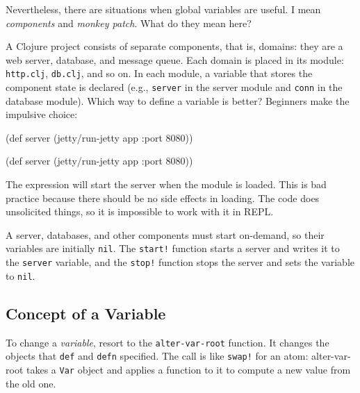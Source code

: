 Nevertheless, there are situations when global variables are useful.
I mean \emph{components} and \emph{monkey patch}. What do they mean here?

A Clojure project consists of separate components, that is, domains: they are a web server, database, and message queue.
Each domain is placed in its module: \verb|http.clj|, \verb|db.clj|, and so on. In each module, a variable that stores the component state is declared (e.g., \verb|server| in the server module and \verb|conn| in the database module).
Which way to define a variable is better?
Beginners make the impulsive choice:

\ifx\DEVICETYPE\MOBILE

\begin{english}
  \begin{clojure}
(def server
  (jetty/run-jetty app {:port 8080}))
  \end{clojure}
\end{english}

\else

\begin{english}
  \begin{clojure}
(def server (jetty/run-jetty app {:port 8080}))
  \end{clojure}
\end{english}

\fi

The expression will start the server when the module is loaded. This is bad practice because there should be no side effects in loading.
The code does unsolicited things, so it is impossible to work with it in REPL.

A server, databases, and other components must start on-demand, so their variables are initially \verb|nil|.
The \verb|start!| function starts a server and writes it to the \verb|server| variable, and the \verb|stop!| function stops the server and sets the variable to \verb|nil|.

\subsection{Concept of a Variable}


\label{var-section}

To change a \emph{variable}, resort to the \verb|alter-var-root| function.
It changes the objects that \verb|def| and \verb|defn| specified.
The call is like \verb|swap!| for an atom: alter-var-root takes a \verb|Var| object and applies a function to it to compute a new value from the old one.

